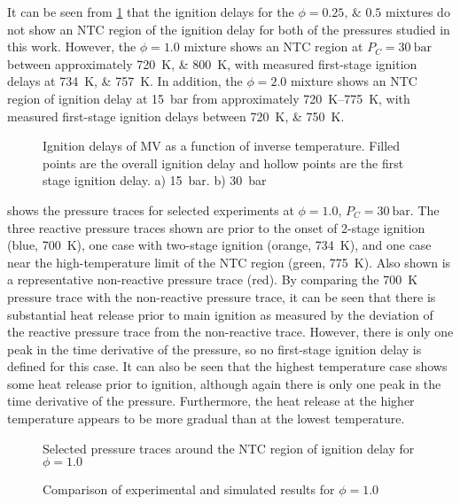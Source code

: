\documentclass[12pt]{../ussci}
\begin{document}
It can be seen from \cref{fig:ignition-delays} that the ignition delays for the
$\phi=\numlist{0.25;0.5}$ mixtures do not show an NTC region of the ignition
delay for both of the pressures studied in this work. However, the $\phi=1.0$
mixture shows an NTC region at $P_C=\SI{30}{\bar}$ between approximately
\SIlist{720;800}{\K}, with measured first-stage ignition delays at
\SIlist{734;757}{\K}. In addition, the $\phi=2.0$ mixture shows an NTC region of
ignition delay at \SI{15}{\bar} from approximately \SIrange{720}{775}{\K}, with
measured first-stage ignition delays between \SIlist{720;750}{\K}.

\begin{figure}[htb]
    \centering
    
    \caption{Ignition delays of MV as a function of inverse temperature. Filled
    points are the overall ignition delay and hollow points are the first stage
    ignition delay. a) \SI{15}{\bar}. b) \SI{30}{\bar}}
    \label{fig:ignition-delays}
\end{figure}

 shows the pressure traces for selected experiments at
\(\phi=1.0\), \(P_C =\SI{30}{\bar}\). The three reactive pressure traces shown
are prior to the onset of 2-stage ignition (blue, \SI{700}{\K}), one case with
two-stage ignition (orange, \SI{734}{\K}), and one case near the
high-temperature limit of the NTC region (green, \SI{775}{\K}). Also shown is a
representative non-reactive pressure trace (red). By comparing the \SI{700}{\K}
pressure trace with the non-reactive pressure trace, it can be seen that there
is substantial heat release prior to main ignition as measured by the deviation
of the reactive pressure trace from the non-reactive trace. However, there is
only one peak in the time derivative of the pressure, so no first-stage ignition
delay is defined for this case. It can also be seen that the highest temperature
case shows some heat release prior to ignition, although again there is only one
peak in the time derivative of the pressure. Furthermore, the heat release at
the higher temperature appears to be more gradual than at the lowest
temperature.

\begin{figure}[htb]
    \begin{minipage}[t]{0.48\textwidth}
        \centering
        \resizebox{\linewidth}{!}{}
        \caption{Selected pressure traces around the NTC region of ignition delay for $\phi=1.0$}
        \label{fig:pressure-traces}
    \end{minipage}\hfill%
    \begin{minipage}[t]{0.48\textwidth}
        \centering
        \resizebox{\linewidth}{!}{}
        \caption{Comparison of experimental and simulated results for $\phi=1.0$}
        \label{fig:simulation-comparison}
    \end{minipage}
\end{figure}
\end{document}
